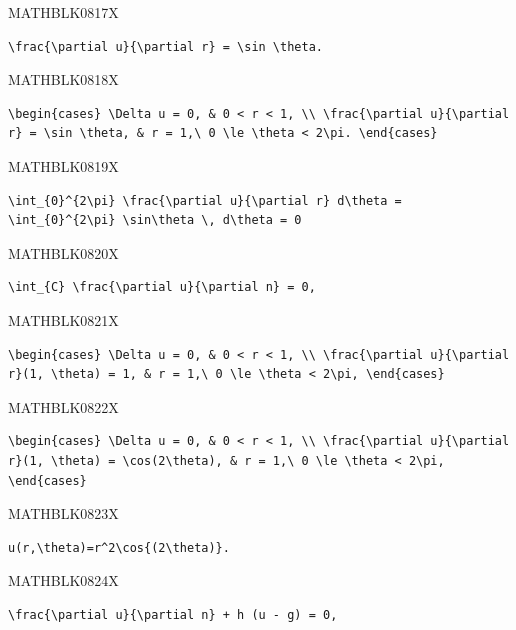 \documentclass[
  ukrainian,
]{article}
\begin{document}
MATHBLK0817X

\begin{verbatim}
\frac{\partial u}{\partial r} = \sin \theta.
\end{verbatim}

MATHBLK0818X

\begin{verbatim}
\begin{cases} \Delta u = 0, & 0 < r < 1, \\ \frac{\partial u}{\partial r} = \sin \theta, & r = 1,\ 0 \le \theta < 2\pi. \end{cases}
\end{verbatim}

MATHBLK0819X

\begin{verbatim}
\int_{0}^{2\pi} \frac{\partial u}{\partial r} d\theta = \int_{0}^{2\pi} \sin\theta \, d\theta = 0
\end{verbatim}

MATHBLK0820X

\begin{verbatim}
\int_{C} \frac{\partial u}{\partial n} = 0,
\end{verbatim}

MATHBLK0821X

\begin{verbatim}
\begin{cases} \Delta u = 0, & 0 < r < 1, \\ \frac{\partial u}{\partial r}(1, \theta) = 1, & r = 1,\ 0 \le \theta < 2\pi, \end{cases}
\end{verbatim}

MATHBLK0822X

\begin{verbatim}
\begin{cases} \Delta u = 0, & 0 < r < 1, \\ \frac{\partial u}{\partial r}(1, \theta) = \cos(2\theta), & r = 1,\ 0 \le \theta < 2\pi, \end{cases}
\end{verbatim}

MATHBLK0823X

\begin{verbatim}
u(r,\theta)=r^2\cos{(2\theta)}.
\end{verbatim}

MATHBLK0824X

\begin{verbatim}
\frac{\partial u}{\partial n} + h (u - g) = 0,
\end{verbatim}
\end{document}
